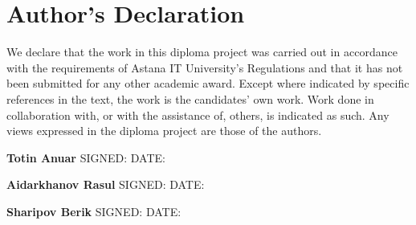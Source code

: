 \chapter{Author's Declaration}\label{authors-declaration}

We declare that the work in this diploma project was carried out in accordance with the requirements of Astana IT University's Regulations and that it has not been submitted for any other academic award. Except where indicated by specific references in the text, the work is the candidates' own work. Work done in collaboration with, or with the assistance of, others, is indicated as such. Any views expressed in the diploma project are those of the authors.

\vspace{2cm}

\noindent \textbf{Totin Anuar} \hfill SIGNED: \underline{\hspace{5cm}} \hfill DATE: \underline{\hspace{3cm}}

\vspace{1cm}

\noindent \textbf{Aidarkhanov Rasul} \hfill SIGNED: \underline{\hspace{5cm}} \hfill DATE: \underline{\hspace{3cm}}

\vspace{1cm}

\noindent \textbf{Sharipov Berik} \hfill SIGNED: \underline{\hspace{5cm}} \hfill DATE: \underline{\hspace{3cm}}

\newpage
